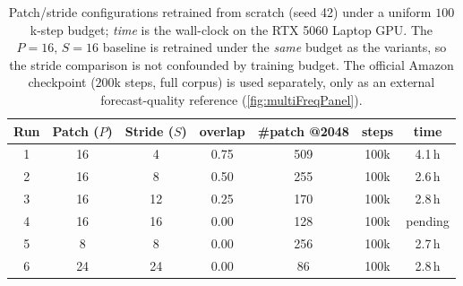\begin{table}[t]
    \centering
    \small
    \begin{tabular}{ccccccc}
        \toprule
        \textbf{Run} & \textbf{Patch ($P$)} & \textbf{Stride ($S$)} & \textbf{overlap} & \textbf{\#patch @2048} & \textbf{steps} & \textbf{time} \\
        \midrule
        1 & 16 & 4  & 0.75 & 509 & 100k & 4.1\,h \\
        2 & 16 & 8  & 0.50 & 255 & 100k & 2.6\,h \\
        3 & 16 & 12 & 0.25 & 170 & 100k & 2.8\,h \\
        4 & 16 & 16 & 0.00 & 128 & 100k & pending \\
        5 & 8  & 8  & 0.00 & 256 & 100k & 2.7\,h \\
        6 & 24 & 24 & 0.00 & 86  & 100k & 2.8\,h \\
        \bottomrule
    \end{tabular}
    \caption{Patch/stride configurations retrained from scratch (seed 42) under a uniform $100$k-step budget; \emph{time} is the wall-clock on the RTX 5060 Laptop GPU. The $P{=}16,\,S{=}16$ baseline is retrained under the \emph{same} budget as the variants, so the stride comparison is not confounded by training budget. The official Amazon checkpoint ($200$k steps, full corpus) is used separately, only as an external forecast-quality reference (\autoref{fig:multiFreqPanel}).}
    \label{tab:patchStride}
\end{table}

